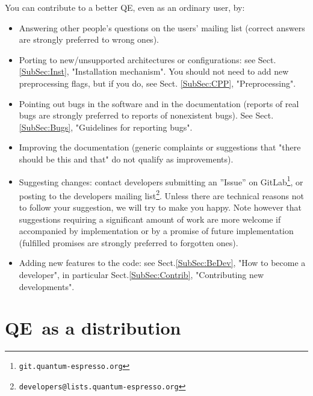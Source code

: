 \documentclass[12pt,a4paper]{article}
\def\qe{QE}
\begin{document}
You can contribute to a better \qe, even as an ordinary user, by:
\begin{itemize}
\item Answering other people's questions on the users' mailing list
  (correct answers are strongly preferred to wrong ones).
\item Porting to new/unsupported architectures or configurations: see
  Sect. \ref{SubSec:Inst}, "Installation mechanism". You should
  not need to add new preprocessing flags, but if you do,
  see Sect. \ref{SubSec:CPP}, "Preprocessing".
\item Pointing out bugs in the software and in the documentation
  (reports of real bugs are strongly preferred to reports of
  nonexistent bugs). See Sect. \ref{SubSec:Bugs}, "Guidelines
  for reporting bugs".
\item Improving the documentation (generic complaints or suggestions
  that "there should be this and that" do not qualify as improvements).
\item Suggesting changes: contact developers submitting an ''Issue'' on
  GitLab\footnote{\tt git.quantum-espresso.org}, or posting to the 
  developers mailing list\footnote{\tt developers@lists.quantum-espresso.org}.
  Unless there are technical reasons not to follow your suggestion,
  we will try to make you happy. Note however that suggestions requiring
  a significant amount of work are more welcome if accompanied by
  implementation or by a promise of future implementation (fulfilled
  promises are strongly preferred to forgotten ones).
\item Adding new features to the code: see Sect.\ref{SubSec:BeDev},
  "How to become a developer", in particular Sect.\ref{SubSec:Contrib},
  "Contributing new developments".
\end{itemize}

\newpage

\section{\qe\ as a distribution}
\end{document}

